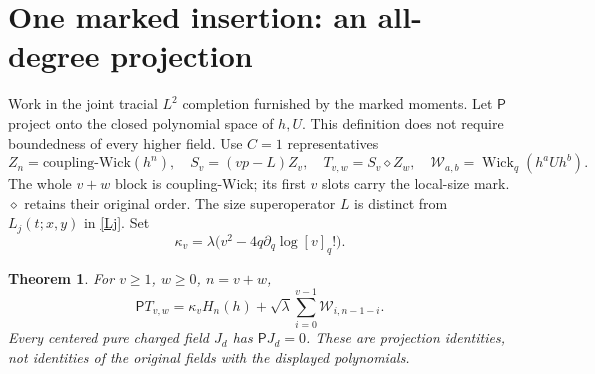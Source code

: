 \documentclass[11pt]{article}
\newcommand{\PP}{\mathsf P}
\newcommand{\WW}{\mathcal W}
\newtheorem{theorem}{Theorem}
\begin{document}
\section{One marked insertion: an all-degree projection}
Work in the joint tracial $L^2$ completion furnished by the marked
moments. Let $\PP$ project onto the closed polynomial space of $h,U$.
This definition does not require boundedness of every higher field.
Use $C=1$ representatives
\[
 Z_n=\text{coupling-Wick}(h^n),\quad S_v=(vp-L)Z_v,
 \quad T_{v,w}=S_v\diamond Z_w,
 \quad\WW_{a,b}=\operatorname{Wick}_q(h^aUh^b).
\]
The whole $v+w$ block is coupling-Wick; its first $v$ slots carry
the local-size mark. $\diamond$ retains their original order.
The size superoperator $L$ is distinct from $L_j(t;x,y)$ in
\eqref{Lj}. Set
\[
 \kappa_v=\lambda\bigl(v^2-4q\partial_q\log [v]_q!\bigr).
\]
\begin{theorem}\label{projection}
For $v\ge1$, $w\ge0$, $n=v+w$,
\begin{equation}\label{proj}
 \PP T_{v,w}=\kappa_vH_n(h)
       +\sqrt\lambda\sum_{i=0}^{v-1}\WW_{i,n-1-i}.
\end{equation}
Every centered pure charged field $J_d$ has $\PP J_d=0$.
These are projection identities, not identities of the original
fields with the displayed polynomials.
\end{theorem}
\end{document}
